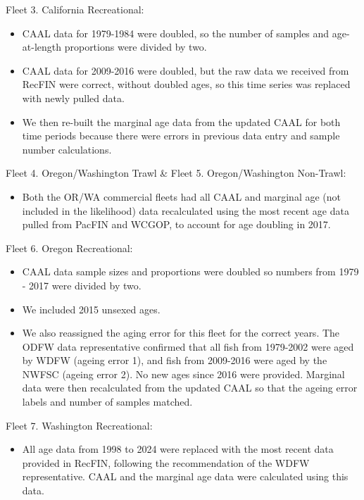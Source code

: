 \documentclass[
]{scrartcl}
\providecommand{\tightlist}{%
  \setlength{\itemsep}{0pt}\setlength{\parskip}{0pt}}\usepackage{longtable,booktabs,array}
\begin{document}
Fleet 3. California Recreational:

\begin{itemize}
\tightlist
\item
  CAAL data for 1979-1984 were doubled, so the number of samples and
  age-at-length proportions were divided by two.
\item
  CAAL data for 2009-2016 were doubled, but the raw data we received
  from RecFIN were correct, without doubled ages, so this time series
  was replaced with newly pulled data.
\item
  We then re-built the marginal age data from the updated CAAL for both
  time periods because there were errors in previous data entry and
  sample number calculations.
\end{itemize}

Fleet 4. Oregon/Washington Trawl \& Fleet 5. Oregon/Washington
Non-Trawl:

\begin{itemize}
\tightlist
\item
  Both the OR/WA commercial fleets had all CAAL and marginal age (not
  included in the likelihood) data recalculated using the most recent
  age data pulled from PacFIN and WCGOP, to account for age doubling in
  2017.
\end{itemize}

Fleet 6. Oregon Recreational:

\begin{itemize}
\tightlist
\item
  CAAL data sample sizes and proportions were doubled so numbers from
  1979 - 2017 were divided by two.
\item
  We included 2015 unsexed ages.
\item
  We also reassigned the aging error for this fleet for the correct
  years. The ODFW data representative confirmed that all fish from
  1979-2002 were aged by WDFW (ageing error 1), and fish from 2009-2016
  were aged by the NWFSC (ageing error 2). No new ages since 2016 were
  provided. Marginal data were then recalculated from the updated CAAL
  so that the ageing error labels and number of samples matched.
\end{itemize}

Fleet 7. Washington Recreational:

\begin{itemize}
\tightlist
\item
  All age data from 1998 to 2024 were replaced with the most recent data
  provided in RecFIN, following the recommendation of the WDFW
  representative. CAAL and the marginal age data were calculated using
  this data.
\end{itemize}
\end{document}
